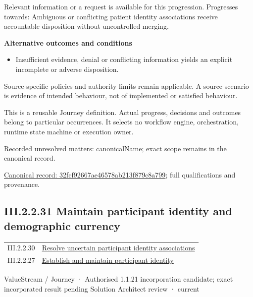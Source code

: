 Relevant information or a request is available for this progression. Progresses towards: Ambiguous or conflicting patient identity associations receive accountable disposition without uncontrolled merging.



\par\medskip\textbf{Alternative outcomes and conditions}\par


\begin{itemize}


\item Insufficient evidence, denial or conflicting information yields an explicit incomplete or adverse disposition.

\end{itemize}


Source-specific policies and authority limits remain applicable. A source scenario is evidence of intended behaviour, not of implemented or satisfied behaviour.



This is a reusable Journey definition. Actual progress, decisions and outcomes belong to particular occurrences. It selects no workflow engine, orchestration, runtime state machine or execution owner.


{\small Recorded unresolved matters: canonicalName; exact scope remains in the canonical record.}\par
{\footnotesize \href{../../../../continuum/strategy/value-stream/32fcf92667ae46578ab213f879c8a799.md}{Canonical record: 32fcf92667ae46578ab213f879c8a799}; full qualifications and provenance.}\par
\subsection*{III.2.2.31 Maintain participant identity and demographic currency}
\label{navigation:III.2.2.31}

\begin{longtable}{p{.22\linewidth}p{.73\linewidth}}
III.2.2.30 & \hyperref[element:32fcf92667ae46578ab213f879c8a799]{Resolve uncertain participant identity associations} \\
III.2.2.27 & \hyperref[element:f0ce31d5b71c4c5ab37ade566b224808]{Establish and maintain participant identity} \\
\end{longtable}
\label{element:393b2a5eeda94c36841c2673ca1f391e}
{\small ValueStream / Journey · Authorised 1.1.21 incorporation candidate; exact incorporated result pending Solution Architect review · current}\par

